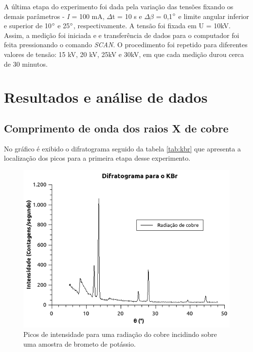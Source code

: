 \documentclass[article,12pt,openright,oneside,a4paper,brazil]{abntex2}
\begin{document}
                A última etapa do experimento foi dada pela variação das tensões fixando os demais parâmetros - \textit{I} = 100 mA, $\Delta$t = 10 s e $\Delta$$\beta$ = 0,1$\degree$ e limite angular inferior e superior de 10$\degree$ e 25$\degree$, respectivamente. A tensão foi fixada em U = 10kV. Assim, a medição foi iniciada e e transferência de dados para o computador foi feita pressionando o comando \textit{SCAN}. 
                O procedimento foi repetido para diferentes valores de tensão: 15 kV, 20 kV, 25kV e 30kV, em que cada medição durou cerca de 30 minutos.

                
        
    
\section{Resultados e análise de dados}

\subsection{Comprimento de onda dos raios X de cobre}

No gráfico \label{fig:kbr} é exibido o difratograma seguido da tabela \ref{tab:kbr} que apresenta a localização dos picos para a primeira etapa desse experimento. 

\begin{figure}[H]
    \centering
    \includegraphics[scale=0.8]{Figuras/KBr_cu.png}
    \caption{Picos de intensidade para uma radiação do cobre incidindo sobre uma amostra de brometo de potássio.}
    \label{fig:kbr}
\end{figure}
\end{document}
